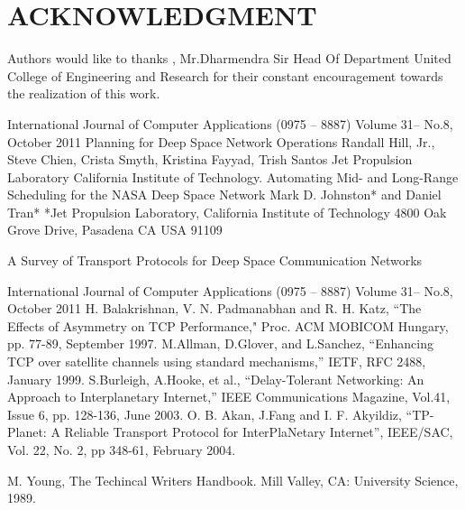 \documentclass[letterpaper, 10 pt, conference]{ieeeconf}  %
\begin{document}








\section*{ACKNOWLEDGMENT}

Authors would like to thanks ,  Mr.Dharmendra Sir  Head Of Department  United College of Engineering and Research  for their constant encouragement towards the realization of this work.






\begin{thebibliography}{99}

 International Journal of Computer Applications (0975 – 8887)
Volume 31– No.8, October 2011
 Planning for Deep Space Network Operations
Randall Hill, Jr., Steve Chien, Crista Smyth, Kristina Fayyad, Trish Santos
Jet Propulsion Laboratory
California Institute of Technology.
 Automating Mid- and Long-Range Scheduling for the NASA Deep Space Network
Mark D. Johnston* and Daniel Tran*
*Jet Propulsion Laboratory, California Institute of Technology
4800 Oak Grove Drive, Pasadena CA USA 91109

 A Survey of Transport Protocols for Deep Space
Communication Networks

International Journal of Computer Applications (0975 – 8887)
Volume 31– No.8, October 2011
 H. Balakrishnan, V. N. Padmanabhan and R. H. Katz, “The Effects of Asymmetry on TCP Performance," Proc. ACM MOBICOM Hungary, pp. 77-89, September 1997.
 M.Allman, D.Glover, and L.Sanchez, “Enhancing TCP over satellite channels using standard mechanisms,” IETF, RFC 2488, January 1999.
S.Burleigh, A.Hooke, et al., “Delay-Tolerant Networking: An Approach to Interplanetary Internet,” IEEE Communications Magazine, Vol.41, Issue 6, pp. 128-136, June 2003.
 O. B. Akan, J.Fang and I. F. Akyildiz, “TP-Planet: A Reliable Transport Protocol for InterPlaNetary Internet”, IEEE/SAC, Vol. 22, No. 2, pp 348-61, February 2004.


  M. Young, The Techincal Writers Handbook. Mill Valley, CA: University
Science, 1989.







\end{thebibliography}
\end{document}

